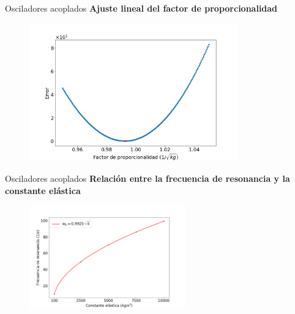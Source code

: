 \begin{frame}{Osciladores acoplados}
    \textbf{Ajuste lineal del factor de proporcionalidad}
    \begin{minipage}[c]{0.8\linewidth}
        \begin{figure}[H]
            \centering
            \includegraphics[width=0.8\textwidth]{pic/05-results/prop_error}
            \label{fig:prop-error}
        \end{figure}
    \end{minipage}
    \begin{minipage}{0.15\linewidth}
        \large{}
    \end{minipage}
\end{frame}

\begin{frame}{Osciladores acoplados}
    \textbf{Relación entre la frecuencia de resonancia y la constante elástica}
    \begin{figure}[H]
        \centering
        \includegraphics[width=0.6\textwidth]{pic/05-results/prop_relation}
        \label{fig:prop-relation}
    \end{figure}
\end{frame}